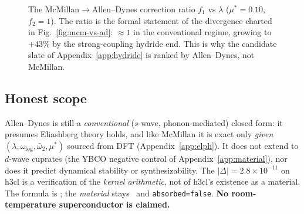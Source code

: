 \begin{figure}[h]
\centering
{}
\caption{The McMillan$\to$Allen--Dynes correction ratio $f_1$ vs $\lambda$
($\mu^{*}=0.10$, $f_2{=}1$). The ratio is the formal statement of the
divergence charted in Fig.~\ref{fig:mcm-vs-ad}: $\approx\!1$ in the
conventional regime, growing to $+43$\% by the strong-coupling hydride
end. This is why the candidate slate of Appendix~\ref{app:hydride} is
ranked by Allen--Dynes, not McMillan.}
\label{fig:ad-vs-mcm-ratio}
\end{figure}

\subsection{Honest scope}
\label{app:ad-honest}

Allen--Dynes is still a \emph{conventional} ($s$-wave, phonon-mediated)
closed form: it presumes Eliashberg theory holds, and like McMillan it is
exact only \emph{given} $(\lambda, \omega_{\log}, \bar\omega_2, \mu^{*})$
sourced from DFT (Appendix~\ref{app:elph}). It does not extend to $d$-wave
cuprates (the YBCO negative control of Appendix~\ref{app:material}), nor
does it predict dynamical stability or synthesizability. The
$|\Delta|=2.8\times10^{-11}$ on h3cl is a verification of the
\emph{kernel arithmetic}, not of h3cl's existence as a material. The
formula is \tierGreen; the \emph{material} stays \tierOrange\ and
\texttt{absorbed=false}. \textbf{No room-temperature superconductor is
claimed.}
